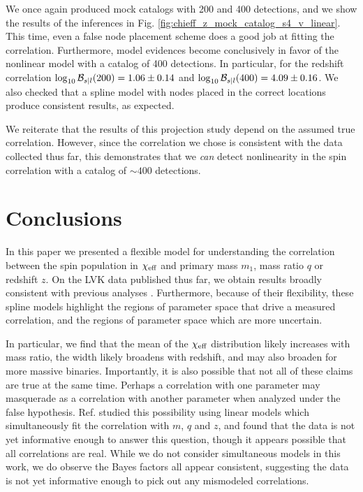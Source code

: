 \documentclass[%
 reprint,
 amsmath,amssymb,
 aps,
 prd,
]{revtex4-2}
\newcommand{\chieff}{\chi_{\rm eff}}
\begin{document}
We once again produced mock catalogs with 200 and 400 detections, and we show the results of the inferences in Fig. \ref{fig:chieff_z_mock_catalog_s4_v_linear}. This time, even a false node placement scheme does a good job at fitting the correlation. Furthermore, model evidences become conclusively in favor of the nonlinear model with a catalog of 400 detections. In particular, for the redshift correlation $\log_{\rm 10}\mathcal{B}_{s|l}(200) = 1.06 \pm 0.14$ and $\log_{\rm 10}\mathcal{B}_{s|l}(400) = 4.09 \pm 0.16$.
We also checked that a spline model with nodes placed in the correct locations produce consistent results, as expected.

We reiterate that the results of this projection study depend on the assumed true correlation. However, since the correlation we chose is consistent with the data collected thus far, this demonstrates that we \textit{can} detect nonlinearity in the spin correlation with a catalog of $\sim400$ detections. 

\section{Conclusions}
\label{sec:conclusion}
In this paper we presented a flexible model for understanding the correlation between the spin population in $\chieff$ and primary mass $m_1$, mass ratio $q$ or redshift $z$. On the \ac{LVK} data published thus far, we obtain results broadly consistent with previous analyses \cite{Safarzadeh:2020mlb,Callister:2021fpo,KAGRA:2021duu,Biscoveanu:2022qac,Franciolini:2022iaa}. Furthermore, because of their flexibility, these spline models highlight the regions of parameter space that drive a measured correlation, and the regions of parameter space which are more uncertain. %

In particular, we find that the mean of the $\chieff$ distribution likely increases with mass ratio, the width likely broadens with redshift, and may also broaden for more massive binaries. Importantly, it is also possible that not all of these claims are true at the same time. Perhaps a correlation with one parameter may masquerade as a correlation with another parameter when analyzed under the false hypothesis. Ref. \cite{Biscoveanu:2022qac} studied this possibility using linear models which simultaneously fit the correlation with $m$, $q$ and $z$, and found that the data is not yet informative enough to answer this question, though it appears possible that all correlations are real. While we do not consider simultaneous models in this work, we do observe the Bayes factors all appear consistent, suggesting the data is not yet informative enough to pick out any mismodeled correlations.
\end{document}
